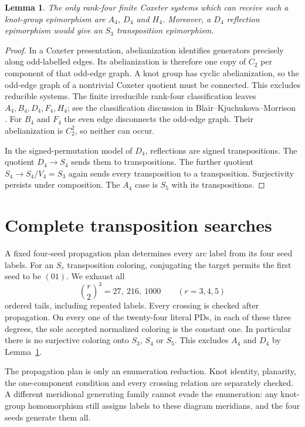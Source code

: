 \documentclass[11pt]{article}
\newtheorem{lemma}[theorem]{Lemma}
\begin{document}
\begin{lemma}\label{lem:targets}
The only rank-four finite Coxeter systems which can receive such a
knot-group epimorphism are $A_4$, $D_4$ and $H_4$.
Moreover, a $D_4$ reflection epimorphism would give an $S_3$
transposition epimorphism.
\end{lemma}
\begin{proof}
In a Coxeter presentation, abelianization identifies generators
precisely along odd-labelled edges. Its abelianization is therefore
one copy of $C_2$ per component of that odd-edge graph. A knot group
has cyclic abelianization, so the odd-edge graph of a nontrivial
Coxeter quotient must be connected. This excludes reducible systems.
The finite irreducible rank-four classification leaves
$A_4,B_4,D_4,F_4,H_4$; see the classification discussion in
Blair--Kjuchukova--Morrison \cite[Section 2.1 and Section 3.1.1]{bkm}.
For $B_4$ and $F_4$ the even edge disconnects the odd-edge graph.
Their abelianization is $C_2^2$, so neither can occur.

In the signed-permutation model of $D_4$, reflections are signed
transpositions. The quotient $D_4\to S_4$ sends them to transpositions.
The further quotient $S_4\to S_4/V_4=S_3$ again sends every
transposition to a transposition. Surjectivity persists under
composition. The $A_4$ case is $S_5$ with its transpositions.
\end{proof}

\section{Complete transposition searches}

A fixed four-seed propagation plan determines every arc label from
its four seed labels. For an $S_r$ transposition coloring, conjugating
the target permits the first seed to be $(01)$. We exhaust all
\[
 \binom r2^3=27,\ 216,\ 1000
 \qquad (r=3,4,5)
\]
ordered tails, including repeated labels. Every crossing is checked
after propagation. On every one of the twenty-four literal PDs, in
each of these three degrees, the sole accepted normalized coloring
is the constant one. In particular there is no surjective coloring
onto $S_3$, $S_4$ or $S_5$. This excludes $A_4$ and $D_4$ by
Lemma~\ref{lem:targets}.

The propagation plan is only an enumeration reduction. Knot identity,
planarity, the one-component condition and every crossing relation
are separately checked. A different meridional generating family
cannot evade the enumeration: any knot-group homomorphism still
assigns labels to these diagram meridians, and the four seeds
generate them all.
\end{document}
